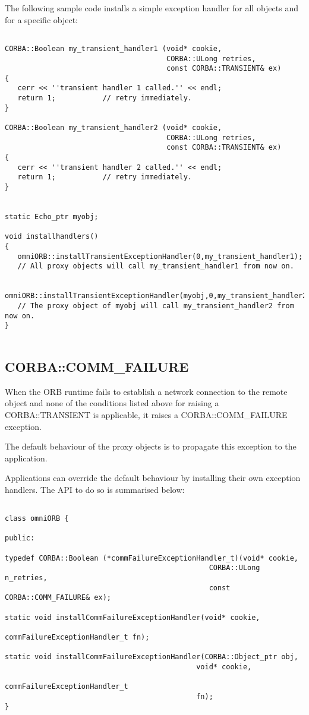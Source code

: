 \documentclass[11pt,twoside,onecolumn]{book}
\begin{document}
The following sample code installs a simple exception handler for all
objects and for a specific object:

{\small
\begin{verbatim}

CORBA::Boolean my_transient_handler1 (void* cookie,
                                      CORBA::ULong retries,
                                      const CORBA::TRANSIENT& ex)
{
   cerr << ''transient handler 1 called.'' << endl;
   return 1;           // retry immediately.
}
 
CORBA::Boolean my_transient_handler2 (void* cookie,
                                      CORBA::ULong retries,
                                      const CORBA::TRANSIENT& ex)
{
   cerr << ''transient handler 2 called.'' << endl;
   return 1;           // retry immediately.
}


static Echo_ptr myobj;

void installhandlers()
{
   omniORB::installTransientExceptionHandler(0,my_transient_handler1);
   // All proxy objects will call my_transient_handler1 from now on.

   omniORB::installTransientExceptionHandler(myobj,0,my_transient_handler2);
   // The proxy object of myobj will call my_transient_handler2 from now on.
}


\end{verbatim}
}


\subsection{CORBA::COMM\_FAILURE}

When the ORB runtime fails to establish a network connection to the remote
object and none of the conditions listed above for raising a
CORBA::TRANSIENT is applicable, it raises a CORBA::COMM\_FAILURE exception.

The default behaviour of the proxy objects is to propagate this exception
to the application.

Applications can override the default behaviour by installing their own
exception handlers. The API to do so is summarised below:

{\small
\begin{verbatim}

class omniORB {

public:

typedef CORBA::Boolean (*commFailureExceptionHandler_t)(void* cookie,
                                                CORBA::ULong n_retries,
                                                const CORBA::COMM_FAILURE& ex);

static void installCommFailureExceptionHandler(void* cookie,
                                             commFailureExceptionHandler_t fn);

static void installCommFailureExceptionHandler(CORBA::Object_ptr obj,
                                             void* cookie,
                                             commFailureExceptionHandler_t
                                             fn);
}
\end{verbatim}
}
\end{document}
